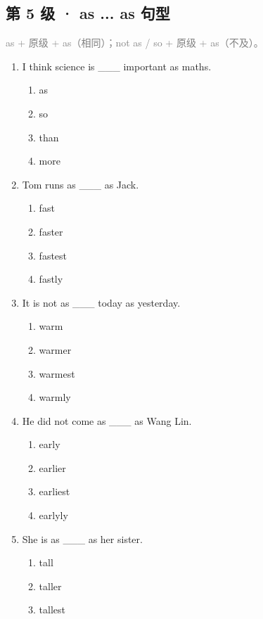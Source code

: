 \documentclass[11pt,a4paper]{ctexart}
\begin{document}
\subsection*{第 5 级 · as ... as 句型}
\noindent\textcolor{gray}{as + 原级 + as（相同）；not as / so + 原级 + as（不及）。}\par\smallskip
\begin{enumerate}[leftmargin=*,itemsep=4pt]
\item I think science is \_\_\_ important as maths.
\begin{enumerate}[label=\Alph*.,leftmargin=2em,itemsep=1pt,topsep=2pt]
\item as
\item so
\item than
\item more
\end{enumerate}
\item Tom runs as \_\_\_ as Jack.
\begin{enumerate}[label=\Alph*.,leftmargin=2em,itemsep=1pt,topsep=2pt]
\item fast
\item faster
\item fastest
\item fastly
\end{enumerate}
\item It is not as \_\_\_ today as yesterday.
\begin{enumerate}[label=\Alph*.,leftmargin=2em,itemsep=1pt,topsep=2pt]
\item warm
\item warmer
\item warmest
\item warmly
\end{enumerate}
\item He did not come as \_\_\_ as Wang Lin.
\begin{enumerate}[label=\Alph*.,leftmargin=2em,itemsep=1pt,topsep=2pt]
\item early
\item earlier
\item earliest
\item earlyly
\end{enumerate}
\item She is as \_\_\_ as her sister.
\begin{enumerate}[label=\Alph*.,leftmargin=2em,itemsep=1pt,topsep=2pt]
\item tall
\item taller
\item tallest

\end{enumerate}
\end{enumerate}
\end{document}

